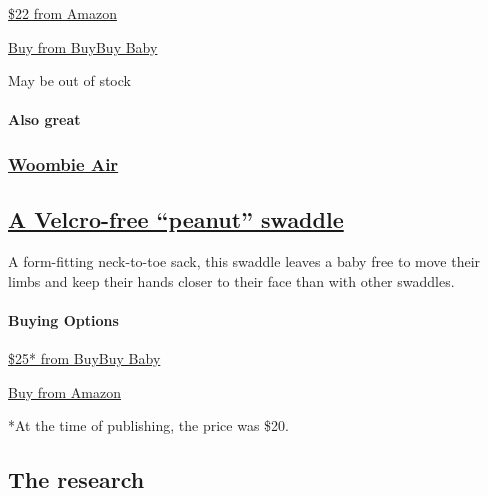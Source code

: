 \href{https://www.nytimes3xbfgragh.onion/wirecutter/out/link/30687/150978/4/86633?merchant=Amazon}{\$22
from Amazon}

\href{https://shop-links.co/1706409802203647217}{Buy from BuyBuy Baby}

May be out of stock

\hypertarget{also-great-1}{%
\paragraph{Also great}\label{also-great-1}}

\href{https://www.nytimes3xbfgragh.onion/wirecutter/out/link/30688/154051/4/86634?merchant=BuyBuy\%20Baby}{}

\hypertarget{woombie-air-1}{%
\subsubsection{\texorpdfstring{\href{https://www.nytimes3xbfgragh.onion/wirecutter/out/link/30688/154051/4/86634?merchant=BuyBuy\%20Baby}{Woombie
Air}}{Woombie Air}}\label{woombie-air-1}}

\hypertarget{a-velcro-free-peanut-swaddle-1}{%
\subsection{\texorpdfstring{\href{https://www.nytimes3xbfgragh.onion/wirecutter/out/link/30688/154051/4/86634?merchant=BuyBuy\%20Baby}{A
Velcro-free ``peanut''
swaddle}}{A Velcro-free ``peanut'' swaddle}}\label{a-velcro-free-peanut-swaddle-1}}

A form-fitting neck-to-toe sack, this swaddle leaves a baby free to move
their limbs and keep their hands closer to their face than with other
swaddles.

\hypertarget{buying-options-5}{%
\paragraph{Buying Options}\label{buying-options-5}}

\href{https://shop-links.co/1715878907105142814}{\$25* from BuyBuy Baby}

\href{https://www.nytimes3xbfgragh.onion/wirecutter/out/link/30688/150979/4/86634?merchant=Amazon}{Buy
from Amazon}

*At the time of publishing, the price was \$20.

\hypertarget{the-research}{%
\subsection{The research}\label{the-research}}

